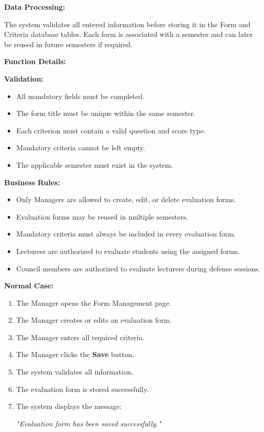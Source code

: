 \textbf{Data Processing:}

The system validates all entered information before storing it in the Form and Criteria database tables. Each form is associated with a semester and can later be reused in future semesters if required.

\vspace{0.3cm}

\textbf{Function Details:}

\textbf{Validation:}

\begin{itemize}
    \item All mandatory fields must be completed.
    \item The form title must be unique within the same semester.
    \item Each criterion must contain a valid question and score type.
    \item Mandatory criteria cannot be left empty.
    \item The applicable semester must exist in the system.
\end{itemize}

\vspace{0.2cm}

\textbf{Business Rules:}

\begin{itemize}
    \item Only Managers are allowed to create, edit, or delete evaluation forms.
    \item Evaluation forms may be reused in multiple semesters.
    \item Mandatory criteria must always be included in every evaluation form.
    \item Lecturers are authorized to evaluate students using the assigned forms.
    \item Council members are authorized to evaluate lecturers during defense sessions.
\end{itemize}

\vspace{0.2cm}

\textbf{Normal Case:}

\begin{enumerate}
    \item The Manager opens the Form Management page.
    \item The Manager creates or edits an evaluation form.
    \item The Manager enters all required criteria.
    \item The Manager clicks the \textbf{Save} button.
    \item The system validates all information.
    \item The evaluation form is stored successfully.
    \item The system displays the message:

    \textit{"Evaluation form has been saved successfully."}
\end{enumerate}

